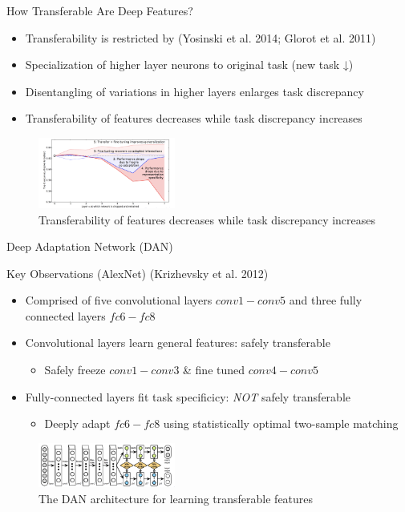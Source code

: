 \documentclass{beamer}
\begin{document}
\begin{frame}[fragile]{How Transferable Are Deep Features?}
\begin{itemize}
  \item{Transferability is restricted by (Yosinski et al. 2014; Glorot et al. 2011)}
  \item{Specialization of higher layer neurons to original task (new task ↓)}
  \item{Disentangling of variations in higher layers enlarges task discrepancy}
  \item{Transferability of features decreases while task discrepancy increases}
\end{itemize}
\begin{figure}[h]
    \centering
    \includegraphics[width=0.4\textwidth]{fig2}
    \caption{Transferability of features decreases while task discrepancy increases}
    \label{fig:mesh2}
\end{figure}
\end{frame}

\begin{frame}[fragile]{Deep Adaptation Network (DAN)}
\begin{block}{Key Observations (AlexNet) (Krizhevsky et al. 2012)}
\begin{itemize}
  \item{Comprised of five convolutional layers $conv1-conv5$ and three fully connected layers $fc6-fc8$}
  \item{Convolutional layers learn general features: safely transferable} 
  \begin{itemize}
  \item{Safely freeze $conv1-conv3$ \& fine tuned $conv4-conv5$}
  \end{itemize}
  \item{Fully-connected layers fit task specificicy: \emph{NOT} safely transferable} 
  \begin{itemize}
  \item{Deeply adapt $fc6-fc8$ using statistically optimal two-sample matching}
  \end{itemize}
\end{itemize}
\end{block}
\begin{figure}[h]
    \centering
    \includegraphics[width=0.4\textwidth]{fig3}
    \caption{The DAN architecture for learning transferable features }
    \label{fig:mesh2}
\end{figure}
\end{frame}
\end{document}
